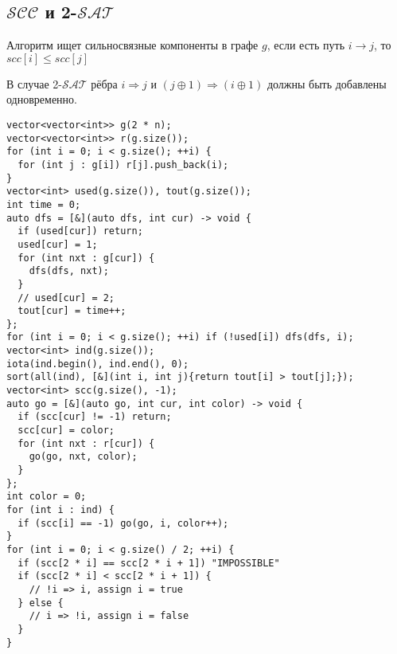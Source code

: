 \subsection{$\mathcal{SCC}$ и 2-$\mathcal{SAT}$}
Алгоритм ищет сильносвязные компоненты в графе $g$, если есть путь $i \rightarrow j$, то $scc[i] \le scc[j]$

В случае 2-$\mathcal{SAT}$ рёбра $i \Rightarrow j$ и $(j\oplus1) \Rightarrow (i \oplus 1)$ должны быть добавлены одновременно.
\begin{lstlisting}
vector<vector<int>> g(2 * n);
vector<vector<int>> r(g.size());
for (int i = 0; i < g.size(); ++i) {
  for (int j : g[i]) r[j].push_back(i);
}
vector<int> used(g.size()), tout(g.size());
int time = 0;
auto dfs = [&](auto dfs, int cur) -> void {
  if (used[cur]) return;
  used[cur] = 1;
  for (int nxt : g[cur]) {
    dfs(dfs, nxt);
  }
  // used[cur] = 2;
  tout[cur] = time++;
};
for (int i = 0; i < g.size(); ++i) if (!used[i]) dfs(dfs, i);
vector<int> ind(g.size());
iota(ind.begin(), ind.end(), 0);
sort(all(ind), [&](int i, int j){return tout[i] > tout[j];});
vector<int> scc(g.size(), -1);
auto go = [&](auto go, int cur, int color) -> void {
  if (scc[cur] != -1) return;
  scc[cur] = color;
  for (int nxt : r[cur]) {
    go(go, nxt, color);
  }
};
int color = 0;
for (int i : ind) {
  if (scc[i] == -1) go(go, i, color++);
}
for (int i = 0; i < g.size() / 2; ++i) {
  if (scc[2 * i] == scc[2 * i + 1]) "IMPOSSIBLE"
  if (scc[2 * i] < scc[2 * i + 1]) {
    // !i => i, assign i = true
  } else {
    // i => !i, assign i = false
  }
}
\end{lstlisting}

